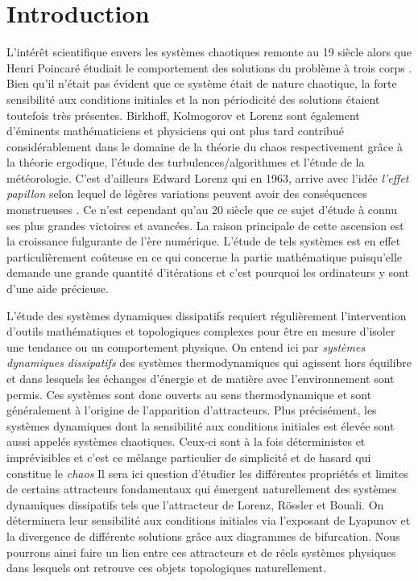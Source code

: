 \section{Introduction} \label{sec: introduction}


L'intérêt scientifique envers les systèmes chaotiques remonte au 19 siècle alors que Henri Poincaré étudiait le comportement des solutions du problème à trois corps \cite{poin_carre}. Bien qu'il n'était pas évident que ce système était de nature chaotique, la forte sensibilité aux conditions initiales et la non périodicité des solutions étaient toutefois très présentes. Birkhoff, Kolmogorov et Lorenz sont également d'éminents mathématiciens et physiciens qui ont plus tard contribué considérablement dans le domaine de la théorie du chaos respectivement grâce à la théorie ergodique, l'étude des turbulences/algorithmes et l'étude de la météorologie. C'est d'ailleurs Edward Lorenz qui en 1963, arrive avec l'idée \textit{l'effet papillon} selon lequel de légères variations peuvent avoir des conséquences monstrueuses \cite{butterfly}. Ce n'est cependant qu'au 20 siècle que ce sujet d'étude à connu ses plus grandes victoires et avancées. La raison principale de cette ascension est la croissance fulgurante de l'ère numérique. L'étude de tels systèmes est en effet particulièrement coûteuse en ce qui concerne la partie mathématique puisqu'elle demande une grande quantité d'itérations et c'est pourquoi les ordinateurs y sont d'une aide précieuse. 

L'étude des systèmes dynamiques dissipatifs requiert régulièrement l'intervention d'outils mathématiques et topologiques complexes pour être en mesure d'isoler une tendance ou un comportement physique. On entend ici par \textit{systèmes dynamiques dissipatifs} des systèmes thermodynamiques qui agissent hors équilibre et dans lesquels les échanges d'énergie et de matière avec l'environnement sont permis. Ces systèmes sont donc ouverts au sens thermodynamique et sont généralement à l'origine de l'apparition d'attracteurs. Plus précisément, les systèmes dynamiques dont la sensibilité aux conditions initiales est élevée sont aussi appelés systèmes chaotiques. Ceux-ci sont à la fois déterministes et imprévisibles et c'est ce mélange particulier de simplicité et de hasard qui constitue le \textit{chaos} Il sera ici question d'étudier les différentes propriétés et limites de certains attracteurs fondamentaux qui émergent naturellement des systèmes dynamiques dissipatifs tels que l'attracteur de Lorenz, Rössler et Bouali. On déterminera leur sensibilité aux conditions initiales via l'exposant de Lyapunov et la divergence de différente solutions grâce aux diagrammes de bifurcation. Nous pourrons ainsi faire un lien entre ces attracteurs et de réels systèmes physiques dans lesquels ont retrouve ces objets topologiques naturellement.